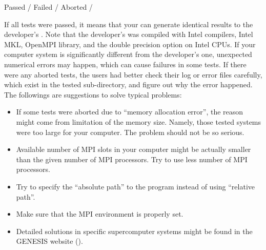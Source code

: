 \documentclass[a4paper,11pt,oneside,english]{sphinxmanual}
\begin{document}
\begin{sphinxVerbatim}[commandchars=\\\{\}]
Passed   / 
Failed   / 
Aborted  / 
\end{sphinxVerbatim}

If all tests were passed, it means that your  can generate
identical results to the developer’s .
Note that the developer’s  was compiled with Intel compilers,
Intel MKL, OpenMPI library, and the double precision option on Intel CPUs.
If your computer system is significantly different from the developer’s one,
unexpected numerical errors may happen, which can cause failures in some tests.
If there were any aborted tests, the users had better check their log or error files carefully,
which exist in the tested sub-directory, and figure out why the error happened.
The followings are suggestions to solve typical problems:
\begin{itemize}
\item {} 
If some tests were aborted due to “memory allocation error”,
the reason might come from limitation of the memory size.
Namely, those tested systems were too large for your computer.
The problem should not be so serious.

\item {} 
Available number of MPI slots in your computer might be actually
smaller than the given number of MPI processors.
Try to use less number of MPI processors.

\item {} 
Try to specify the “absolute path” to the program instead of using “relative path”.

\item {} 
Make sure that the MPI environment is properly set.

\item {} 
Detailed solutions in specific supercomputer systems might be found in the GENESIS website
().

\end{itemize}
\end{document}
